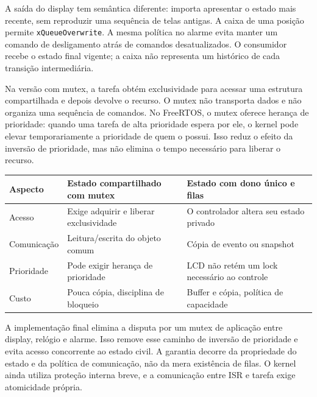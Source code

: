 A saída do display tem semântica diferente: importa apresentar o estado mais recente, sem reproduzir uma sequência de telas antigas. A caixa de uma posição permite \texttt{xQueueOverwrite}. A mesma política no alarme evita manter um comando de desligamento atrás de comandos desatualizados. O consumidor recebe o estado final vigente; a caixa não representa um histórico de cada transição intermediária.

Na versão com mutex, a tarefa obtém exclusividade para acessar uma estrutura compartilhada e depois devolve o recurso. O mutex não transporta dados e não organiza uma sequência de comandos. No FreeRTOS, o mutex oferece herança de prioridade: quando uma tarefa de alta prioridade espera por ele, o kernel pode elevar temporariamente a prioridade de quem o possui. Isso reduz o efeito da inversão de prioridade, mas não elimina o tempo necessário para liberar o recurso. \autocite{fonte2}

\begin{center}\small
\begin{tabularx}{\textwidth}{@{}YYY@{}}\toprule

\textbf{Aspecto} & \textbf{Estado compartilhado com mutex} & \textbf{Estado com dono único e filas} \\ \midrule

Acesso & Exige adquirir e liberar exclusividade & O controlador altera seu estado privado \\

Comunicação & Leitura/escrita do objeto comum & Cópia de evento ou snapshot \\

Prioridade & Pode exigir herança de prioridade & LCD não retém um lock necessário ao controle \\

Custo & Pouca cópia, disciplina de bloqueio & Buffer e cópia, política de capacidade \\

\bottomrule\end{tabularx}
\end{center}

A implementação final elimina a disputa por um mutex de aplicação entre display, relógio e alarme. Isso remove esse caminho de inversão de prioridade e evita acesso concorrente ao estado civil. A garantia decorre da propriedade do estado e da política de comunicação, não da mera existência de filas. O kernel ainda utiliza proteção interna breve, e a comunicação entre ISR e tarefa exige atomicidade própria.

